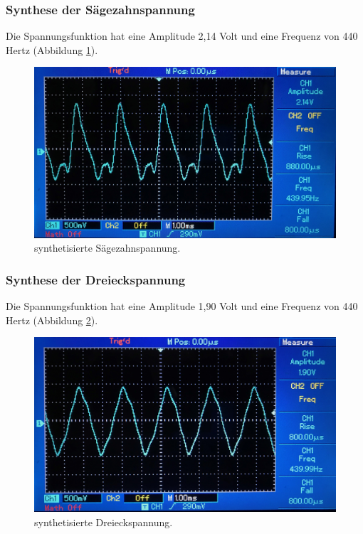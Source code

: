 \subsubsection{Synthese der Sägezahnspannung}
Die Spannungsfunktion hat eine Amplitude 2,14 Volt und eine Frequenz von 440 Hertz (Abbildung \ref{fig:abb5}).
\begin{figure}
  \centering
  \includegraphics[width=\textwidth]{abb5.jpg}
  \caption{synthetisierte Sägezahnspannung.}
  \label{fig:abb5}
\end{figure}
\subsubsection{Synthese der Dreieckspannung}
Die Spannungsfunktion hat eine Amplitude 1,90 Volt und eine Frequenz von 440 Hertz (Abbildung \ref{fig:abb6}).
\begin{figure}
  \centering
  \includegraphics[width=\textwidth]{abb6.jpg}
  \caption{synthetisierte Dreieckspannung.}
  \label{fig:abb6}
\end{figure}
